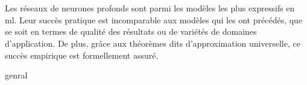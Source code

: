 
\section{}

Les réseaux de neurones profonds sont parmi les modèles les plus expressifs en \gls{ml}.
Leur succès pratique est incomparable aux modèles qui les ont précédés, 
que se soit en termes de qualité des résultats ou de variétés de domaines d'application.
De plus, grâce aux théorèmes dits d'approximation universelle, ce succès empirique est formellement assuré.

{genral}